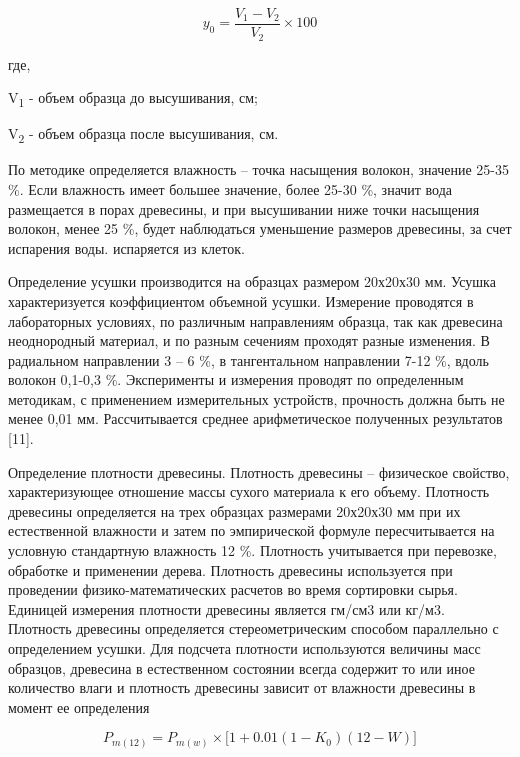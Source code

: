 \begin{equation}
y_{0} = \frac{V_{1} - V_{2}}{V_{2}} \times 100
\end{equation}

\begin{multicols}{2}
где,

V\textsubscript{1} - объем образца до высушивания, см;

V\textsubscript{2} - объем образца после высушивания, см.

По методике определяется влажность -- точка насыщения волокон, значение
25-35 \%. Если влажность имеет большее значение, более 25-30 \%, значит
вода размещается в порах древесины, и при высушивании ниже точки
насыщения волокон, менее 25 \%, будет наблюдаться уменьшение размеров
древесины, за счет испарения воды. испаряется из клеток.

Определение усушки производится на образцах размером 20х20х30 мм. Усушка
характеризуется коэффициентом объемной усушки. Измерение проводятся в
лабораторных условиях, по различным направлениям образца, так как
древесина неоднородный материал, и по разным сечениям проходят разные
изменения. В радиальном направлении 3 -- 6 \%, в тангентальном
направлении 7-12 \%, вдоль волокон 0,1-0,3 \%. Эксперименты и измерения
проводят по определенным методикам, с применением измерительных
устройств, прочность должна быть не менее 0,01 мм. Рассчитывается
среднее арифметическое полученных результатов {[}11{]}.

Определение плотности древесины. Плотность древесины -- физическое
свойство, характеризующее отношение массы сухого материала к его объему.
Плотность древесины определяется на трех образцах размерами 20х20х30 мм
при их естественной влажности и затем по эмпирической формуле
пересчитывается на условную стандартную влажность 12 \%. Плотность
учитывается при перевозке, обработке и применении дерева. Плотность
древесины используется при проведении физико-математических расчетов во
время сортировки сырья. Единицей измерения плотности древесины является
гм/см3 или кг/м3. Плотность древесины определяется стереометрическим
способом параллельно с определением усушки. Для подсчета плотности
используются величины масс образцов, древесина в естественном состоянии
всегда содержит то или иное количество влаги и плотность древесины
зависит от влажности древесины в момент ее определения
\end{multicols}

\begin{equation}
P_{m(12)} = P_{m(w)} \times \text{[}1 + 0.01(1 - K_{0})(12 - W)\rbrack
\end{equation}

